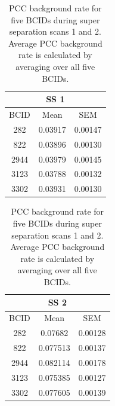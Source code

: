 \begin{table}[!htp]
  \centering
  \caption[2022 PCC background rate]{PCC background rate for five BCIDs during super separation scans 1 and 2. Average PCC background rate is calculated by averaging over all five BCIDs.}
    \begin{minipage}{0.45\textwidth}
        \centering
        \begin{tabular}{ccc}
          \hline
            \multicolumn{3}{|c|}{SS 1} \\
            \hline
            BCID & Mean & SEM \\
            \hline
            282 & 0.03917 & 0.00147 \\
            822 & 0.03896 & 0.00130 \\
            2944 & 0.03979 & 0.00145 \\
            3123 & 0.03788 & 0.00132 \\
            3302 & 0.03931 & 0.00130 \\
        \end{tabular}
    \end{minipage}%
    \hfill
    \begin{minipage}{0.45\textwidth}
        \centering
        \begin{tabular}{ccc}
            \hline
            \multicolumn{3}{|c|}{SS 2} \\
            \hline
            BCID & Mean & SEM \\
            \hline
            282 & 0.07682 & 0.00128 \\
            822 & 0.077513 & 0.00137 \\
            2944 & 0.082114 & 0.00178 \\
            3123 & 0.075385 & 0.00127 \\
            3302 & 0.077605 & 0.00139 \\
        \end{tabular}
    \end{minipage}
    \label{table:side_by_side}
\end{table}

